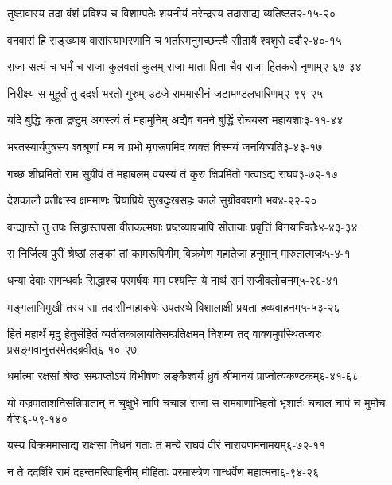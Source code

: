\annotwolineshloka
{तुष्टावास्य तदा वंशं  प्रविश्य च विशाम्पतेः}
{शयनीयं नरेन्द्रस्य तदासाद्य व्यतिष्ठत}{२-१५-२०}

\annotwolineshloka
{वनवासं हि सङ्ख्याय वासांस्याभरणानि च}
{भर्तारमनुगच्छन्त्यै सीतायै श्वशुरो ददौ}{२-४०-१५}

\annotwolineshloka
{राजा सत्यं च धर्मं च  राजा कुलवतां कुलम्}
{राजा माता पिता चैव राजा हितकरो नृणाम्}{२-६७-३४}

\annotwolineshloka
{निरीक्ष्य स मुहूर्तं तु ददर्श भरतो गुरुम्}
{उटजे राममासीनं जटामण्डलधारिणम्}{२-९९-२५}

\annotwolineshloka
{यदि बुद्धिः कृता द्रष्टुम् अगस्त्यं तं महामुनिम्}
{अद्यैव गमने बुद्धिं रोचयस्व महायशाः}{३-११-४४}

\annotwolineshloka
{भरतस्यार्यपुत्रस्य श्वश्रूणां मम च प्रभो}
{मृगरूपमिदं व्यक्तं विस्मयं जनयिष्यति}{३-४३-१७}

\annotwolineshloka
{गच्छ शीघ्रमितो राम सुग्रीवं तं महाबलम्}
{वयस्यं तं कुरु क्षिप्रमितो गत्वाऽद्य राघव}{३-७२-१७}

\annotwolineshloka
{देशकालौ प्रतीक्षस्व क्षममाणः प्रियाप्रिये}
{सुखदुःखसहः काले  सुग्रीववशगो भव}{४-२२-२०}

\annotwolineshloka
{वन्द्यास्ते तु तपः सिद्धास्तपसा वीतकल्मषाः}
{प्रष्टव्याश्चापि सीतायाः प्रवृत्तिं विनयान्वितैः}{४-४३-३४}

\annotwolineshloka
{स निर्जित्य पुरीं श्रेष्ठां लङ्कां तां कामरूपिणीम्}
{विक्रमेण महातेजा हनूमान् मारुतात्मजः}{५-४-१}

\annotwolineshloka
{धन्या देवाः सगन्धर्वाः सिद्धाश्च परमर्षयः}
{मम पश्यन्ति ये नाथं रामं राजीवलोचनम्}{५-२६-४१}

\annotwolineshloka
{मङ्गलाभिमुखी तस्य सा तदासीन्महाकपेः}
{उपतस्थे विशालाक्षी प्रयता हव्यवाहनम्}{५-५३-२६}

\annofourlineindentedshloka
{हितं महार्थं मृदु हेतुसंहितं}
{व्यतीतकालायतिसम्प्रतिक्षमम्}
{निशम्य तद् वाक्यमुपस्थितज्वरः}
{प्रसङ्गवानुत्तरमेतदब्रवीत्}{६-१०-२७}

\annotwolineshloka
{धर्मात्मा रक्षसां श्रेष्ठः सम्प्राप्तोऽयं विभीषणः}
{लङ्कैश्वर्यं ध्रुवं श्रीमानयं प्राप्नोत्यकण्टकम्}{६-४१-६८}

\annofourlineindentedshloka
{यो वज्रपाताशनिसन्निपातान्}
{न चुक्षुभे नापि चचाल राजा}
{स रामबाणाभिहतो भृशार्तः}
{चचाल चापं च मुमोच वीरः}{६-५९-१४०}

\annotwolineshloka
{यस्य विक्रममासाद्य राक्षसा निधनं गताः}
{तं मन्ये राघवं वीरं नारायणमनामयम्}{६-७२-११}

\annotwolineshloka
{न ते ददर्शिरे रामं दहन्तमरिवाहिनीम्}
{मोहिताः परमास्त्रेण गान्धर्वेण महात्मना}{६-९४-२६}

